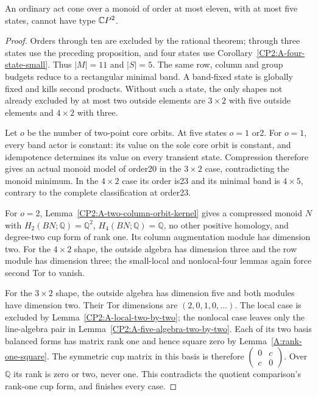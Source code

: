 \begin{theorem}
\label{CP2:A-eleven-five-state-actual}
An ordinary act cone over a monoid of order at most eleven,
with at most five states, cannot have type $\mathbb{C}P^2$.
\end{theorem}
\begin{proof}
Orders through ten are excluded by the rational theorem;
through three states use the preceding proposition, and
four states use Corollary~\ref{CP2:A-four-state-small}.
Thus $|M|=11$ and $|S|=5$. The same row, column and
group budgets reduce to a rectangular minimal band.
A band-fixed state is globally fixed and kills second
products. Without such a state, the only shapes not
already excluded by at most two outside elements are
$3\times2$ with five outside elements and
$4\times2$ with three.

Let $o$ be the number of two-point core orbits. At five
states $o=1$ or2. For $o=1$, every band actor is constant:
its value on the sole core orbit is constant, and
idempotence determines its value on every transient state.
Compression therefore gives an actual monoid model of
order20 in the $3\times2$ case, contradicting the monoid
minimum. In the $4\times2$ case its order is23 and its
minimal band is $4\times5$, contrary to the complete
classification at order23.

For $o=2$, Lemma~\ref{CP2:A-two-column-orbit-kernel}
gives a compressed monoid $N$ with $H_2(BN;\mathbb Q)
=\mathbb Q^2$, $H_4(BN;\mathbb Q)=\mathbb Q$, no other
positive homology, and degree-two cup form of rank one.
Its column augmentation module has dimension two.
For the $4\times2$ shape, the outside algebra has
dimension three and the row module has dimension three;
the small-local and nonlocal-four lemmas again force
second Tor to vanish.

For the $3\times2$ shape, the outside algebra has
dimension five and both modules have dimension two.
Their Tor dimensions are $(2,0,1,0,\ldots)$.
The local case is excluded by
Lemma~\ref{CP2:A-local-two-by-two}; the nonlocal case
leaves only the line-algebra pair in
Lemma~\ref{CP2:A-five-algebra-two-by-two}.
Each of its two basis balanced forms has matrix rank one
and hence square zero by Lemma~\ref{A:rank-one-square}.
The symmetric cup matrix in this basis is therefore
$\left(\begin{smallmatrix}0&c\\c&0\end{smallmatrix}\right)$.
Over $\mathbb Q$ its rank is zero or two, never one.
This contradicts the quotient comparison's rank-one cup
form, and finishes every case.
\end{proof}


